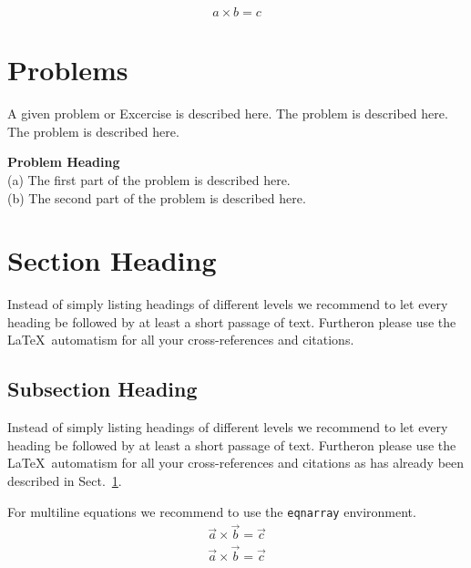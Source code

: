 \documentclass[graybox,envcountchap,sectrefs]{svmono}
\begin{document}
\begin{equation}
	a \times b = c
\end{equation}
\section*{Problems}
%
\begin{prob}
	\label{prob1}
	A given problem or Excercise is described here. The
	problem is described here. The problem is described here.
\end{prob}

\begin{prob}
	\label{prob2}
	\textbf{Problem Heading}\\
	(a) The first part of the problem is described here.\\
	(b) The second part of the problem is described here.
\end{prob}


\section{Section Heading}
\label{sec:A1}
Instead of simply listing headings of different levels we recommend to let every heading be followed by at least a short passage of text. Furtheron please use the \LaTeX\ automatism for all your cross-references and citations.


\subsection{Subsection Heading}
\label{sec:A2}
Instead of simply listing headings of different levels we recommend to let every heading be followed by at least a short passage of text. Furtheron please use the \LaTeX\ automatism for all your cross-references and citations as has already been described in Sect.~\ref{sec:A1}.

For multiline equations we recommend to use the \verb|eqnarray| environment.
\begin{eqnarray}
	\vec{a}\times\vec{b}=\vec{c} \nonumber\\
	\vec{a}\times\vec{b}=\vec{c}
	\label{eq:A01}
\end{eqnarray}
\end{document}
